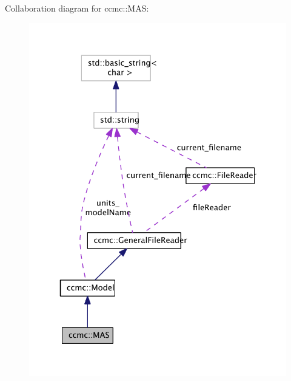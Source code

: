 Collaboration diagram for ccmc\-:\-:M\-A\-S\-:\nopagebreak
\begin{figure}[H]
\begin{center}
\leavevmode
\includegraphics[width=325pt]{classccmc_1_1_m_a_s__coll__graph}
\end{center}
\end{figure}
